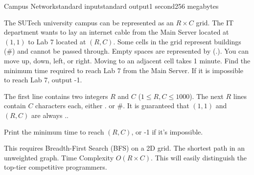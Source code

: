 \begin{problem}{Campus Network}{standard input}{standard output}{1 second}{256 megabytes}

The SUTech university campus can be represented as an $R \times C$ grid. The IT department wants to lay an internet cable from the Main Server located at $(1, 1)$ to Lab 7 located at $(R, C)$.
Some cells in the grid represent buildings (#) and cannot be passed through. Empty spaces are represented by (.).
You can move up, down, left, or right. Moving to an adjacent cell takes 1 minute.
Find the minimum time required to reach Lab 7 from the Main Server. If it is impossible to reach Lab 7, output -1.

\InputFile
The first line contains two integers $R$ and $C$ ($1 \le R, C \le 1000$).
The next $R$ lines contain $C$ characters each, either . or #.
It is guaranteed that $(1,1)$ and $(R,C)$ are always ..

\OutputFile
Print the minimum time to reach $(R,C)$, or -1 if it's impossible.

\Example

\begin{example}
%
\end{example}

\Note
This requires Breadth-First Search (BFS) on a 2D grid. The shortest path in an unweighted graph. Time Complexity $O(R \times C)$. This will easily distinguish the top-tier competitive programmers.

\end{problem}

